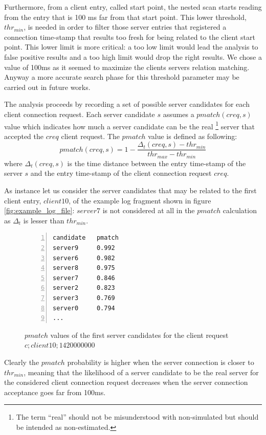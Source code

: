 Furthermore, from a client
entry, called start point, the nested scan starts reading from the entry that is 100 ms far
from that start point. This lower threshold, $thr_{min}$, is needed in order to
 filter those server entries that registered a connection time-stamp
that results too fresh for being related to the client start point. This
lower limit is more critical: a too low limit would lead the analysis to false
positive results and a too high limit would drop the right results.
We chose a value of 100ms as it seemed to maximize 
the clients servers relation matching. Anyway a more accurate search
phase for this threshold parameter may be carried out in future works.

The analysis proceeds by recording a set of possible server candidates 
 for each client connection request. Each server candidate $s$ assumes a
$pmatch(creq,s)$ value which
indicates how much a server candidate can be the real
\footnote{The term ``real'' should not be misunderstood with
non-simulated but should be intended as non-estimated.}
 server that
accepted the $creq$
client request. The $pmatch$ value is defined
as following:
\begin{equation}
pmatch(creq, s) = 1 - \frac{\Delta_t(creq, s) - thr_{min}}{thr_{max} - thr_{min}}
\end{equation}
where $\Delta_t(creq, s)$ is the time distance between the entry
time-stamp of the server $s$ and the entry time-stamp of the client connection request 
$creq$.

As instance let us consider the server candidates that may be related to the first
client entry, $client10$, of the example log
fragment shown in figure \ref{fig:example_log_file}: 
$server7$ is not considered at all in the $pmatch$ calculation  as
$\Delta_t$ 
is lesser than $thr_{min}$. 

\begin{figure}[h]
\begin{lstlisting}[language=bash,frame=single, numbers=left]
candidate 	pmatch
server9 	0.992
server6 	0.982
server8 	0.975
server7  	0.846
server2  	0.823 
server3  	0.769
server0  	0.794
...
\end{lstlisting}
\caption{$pmatch$ values of the first server candidates for the client
request $c;client10;1420000000$}
\label{fig:pmatch}
\end{figure}

Clearly the $pmatch$ probability is higher when the server connection is
closer to $thr_{min}$, meaning that the likelihood of a server
candidate to be the real server for the considered client connection
request decreases when
the server connection acceptance goes far from 100ms. 

